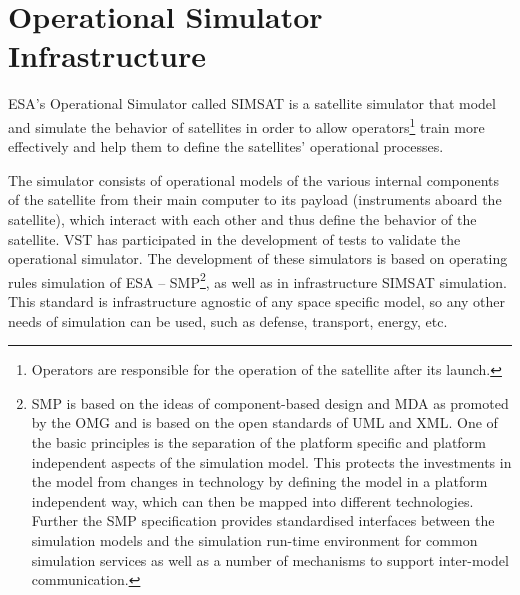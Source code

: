 \section{Operational Simulator Infrastructure}
\ac{ESA}'s Operational Simulator called \ac{SIMSAT}
is a satellite simulator that model and simulate
the behavior of satellites in order to allow operators\footnote{Operators are responsible for the operation of the satellite after its launch.} train more effectively 
and help them to define the satellites' operational processes.

The simulator consists of operational models of the various internal components of the satellite from their main computer to its payload (instruments aboard the satellite),
which interact with each other and thus define the behavior of the satellite.
VST has participated in the development of tests to validate the operational simulator.
The development of these simulators is based on operating rules simulation of
\ac{ESA} -- \ac{SMP}\footnote{\ac{SMP} is based on the ideas of component-based design and \ac{MDA}
as promoted by the \ac{OMG} and is based on the open standards of \ac{UML} and \ac{XML}.
One of the basic principles is the separation of the platform specific and platform independent aspects of the simulation model.
This protects the investments in the model from changes in technology by defining the model in a platform independent way, which can then be mapped into different technologies.
Further the SMP specification provides standardised interfaces between the simulation models and the simulation run-time environment for common simulation services as well as a
number of mechanisms to support inter-model communication.\cite{1A,2A,3A,4A,5A}}, as well as in infrastructure \ac{SIMSAT} simulation.
This standard is infrastructure agnostic of any space specific model, so any other needs of simulation can be used, such as defense, transport, energy, etc.\\


